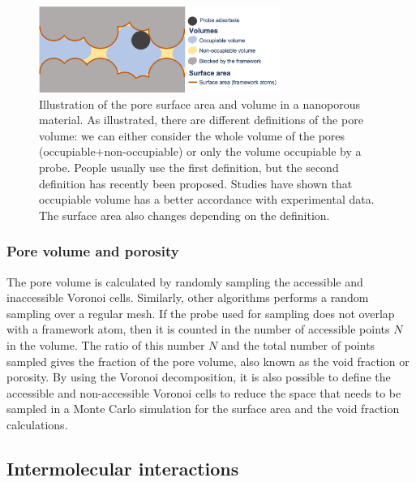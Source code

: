\documentclass[main.tex]{subfiles}
\begin{document}
\begin{figure}[ht!]
  \centering
  \includegraphics[width=0.7\textwidth]{figures/1-screening/Pore_descriptors.jpg}
  \caption{Illustration of the pore surface area and volume in a nanoporous material. As illustrated, there are different definitions of the pore volume: we can either consider the whole volume of the pores (occupiable+non-occupiable) or only the volume occupiable by a probe. People usually use the first definition, but the second definition has recently been proposed. Studies have shown that occupiable volume has a better accordance with experimental data.\autocite{vol_Ongari2017} The surface area also changes depending on the definition. }\label{fgr:pores}
\end{figure}

\subsubsection{Pore volume and porosity}

The pore volume is calculated by randomly sampling the accessible and inaccessible Voronoi cells. Similarly, other algorithms performs a random sampling over a regular mesh. If the probe used for sampling does not overlap with a framework atom, then it is counted in the number of accessible points $N$ in the volume. The ratio of this number $N$ and the total number of points sampled gives the fraction of the pore volume, also known as the void fraction or porosity. By using the Voronoi decomposition, it is also possible to define the accessible and non-accessible Voronoi cells to reduce the space that needs to be sampled in a Monte Carlo simulation for the surface area and the void fraction calculations.


\subsection{Intermolecular interactions}\label{sct:interaction}
\end{document}
